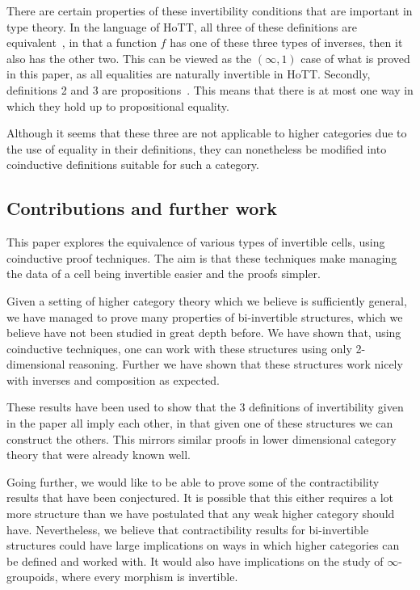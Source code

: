\documentclass{article}
\begin{document}
There are certain properties of these invertibility conditions that
are important in type theory. In the language of HoTT, all three of
these definitions are equivalent~\cite[Corollary 4.3.3]{hottbook}, in
that a function \(f\) has one of these three types of inverses, then
it also has the other two. This can be viewed as the \((\infty,1)\)
case of what is proved in this paper, as all equalities are naturally
invertible in HoTT. Secondly, definitions 2 and 3 are
propositions~\cite[Theorem 4.2.13, Theorem 4.3.2]{hottbook}. This
means that there is at most one way in which they hold up to
propositional equality.

Although it seems that these three are not applicable to higher
categories due to the use of equality in their definitions, they can
nonetheless be modified into coinductive definitions suitable for such
a category.

\subsection{Contributions and further work}\label{sec:conclusion}

This paper explores the equivalence of various types of invertible
cells, using coinductive proof techniques. The aim is that these
techniques make managing the data of a cell being invertible easier
and the proofs simpler.

Given a setting of higher category theory which we believe is
sufficiently general, we have managed to prove many properties of
bi-invertible structures, which we believe have not been studied in
great depth before. We have shown that, using coinductive techniques,
one can work with these structures using only 2-dimensional reasoning.
Further we have shown that these structures work nicely with inverses
and composition as expected.

These results have been used to show that the 3 definitions of
invertibility given in the paper all imply each other, in that given
one of these structures we can construct the others. This mirrors
similar proofs in lower dimensional category theory that were already
known well.

Going further, we would like to be able to prove some of the
contractibility results that have been conjectured. It is possible
that this either requires a lot more structure than we have postulated
that any weak higher category should have. Nevertheless, we believe
that contractibility results for bi-invertible structures could have
large implications on ways in which higher categories can be defined
and worked with. It would also have implications on the study of
\(\infty\)-groupoids, where every morphism is invertible.
\end{document}
